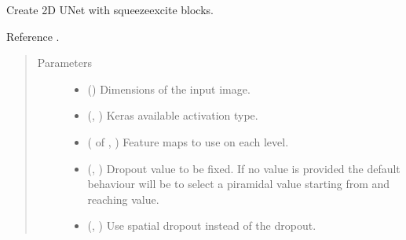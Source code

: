 \documentclass[letterpaper,10pt,english]{sphinxmanual}
\begin{document}
\begin{fulllineitems}
\label{\detokenize{models/se_unet_2d:models.se_unet_2d.SE_U_Net_2D}}
Create 2D U\sphinxhyphen{}Net with squeeze\sphinxhyphen{}excite blocks.

Reference .
\begin{quote}\begin{description}
\item[{Parameters}] \leavevmode\begin{itemize}
\item {} 
 () \textendash{} Dimensions of the input image.

\item {} 
 (, ) \textendash{} Keras available activation type.

\item {} 
 ( of , ) \textendash{} Feature maps to use on each level.

\item {} 
 (, ) \textendash{} Dropout value to be fixed. If no value is provided the default behaviour will be to select a piramidal value
starting from  and reaching  value.

\item {} 
 (, ) \textendash{} Use spatial dropout instead of the  dropout.


\end{itemize}
\end{description}
\end{quote}
\end{fulllineitems}
\end{document}
